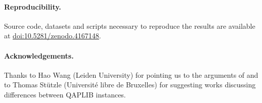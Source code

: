 \documentclass[runningheads]{llncs}
\newcommand{\supplement}{\href{http://doi.org/10.5281/zenodo.4167148}{doi:10.5281/zenodo.4167148}}
\begin{document}


\begin{smaller}
  \paragraph*{Reproducibility.} Source code, datasets and scripts necessary to reproduce the results are available at \supplement.
  \vspace*{-1em}
\paragraph*{Acknowledgements.}
%
Thanks to Hao Wang (Leiden University) for pointing us to the arguments of
\citet{EriPeaGar2019scalable} and to Thomas Stützle (Université libre de Bruxelles) for suggesting works
discussing differences between QAPLIB instances.
\end{smaller}



\renewcommand{\doi}[1]{doi:\hspace{.16667em plus .08333em}\discretionary{}{}{}\href{https://doi.org/#1}{\urlstyle{rm}\nolinkurl{#1}}}

\end{document}
